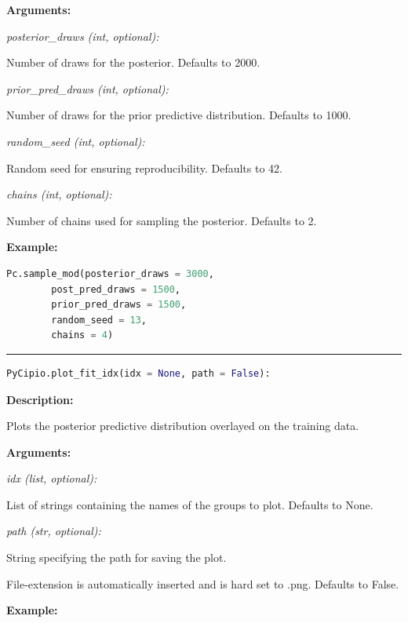 \documentclass{article}
\begin{document}
\indent \textbf{Arguments:}

\indent \indent \textit{posterior\_draws (int, optional):} 

\indent \indent \indent Number of draws for the posterior. Defaults to 2000.

\indent \indent \textit{prior\_pred\_draws (int, optional):} 

\indent \indent \indent Number of draws for the prior predictive distribution. Defaults to 1000.

\indent \indent \textit{random\_seed (int, optional):}

\indent \indent \indent Random seed for ensuring reproducibility. Defaults to 42.

\indent \indent \textit{chains (int, optional):} 

\indent \indent \indent Number of chains used for sampling the posterior. Defaults to 2.

\indent \textbf{Example:}

\begin{lstlisting}[language=Python]
        Pc.sample_mod(posterior_draws = 3000, 
        post_pred_draws = 1500, 
        prior_pred_draws = 1500, 
        random_seed = 13, 
        chains = 4)
\end{lstlisting}


\hrule

\begin{lstlisting}[language=Python]
    PyCipio.plot_fit_idx(idx = None, path = False):
\end{lstlisting}

\indent \textbf{Description:} 

\indent \indent Plots the posterior predictive distribution overlayed on the training data.

\indent \textbf{Arguments:}

\indent \indent \textit{idx (list, optional):} 

\indent \indent \indent List of strings containing the names of the groups to plot. Defaults to None.

\indent \indent \textit{path (str, optional):}

\indent \indent \indent String specifying the path for saving the plot. 

\indent \indent \indent File-extension is automatically inserted and is hard set to .png. Defaults to False.

\indent \textbf{Example:}
\end{document}
